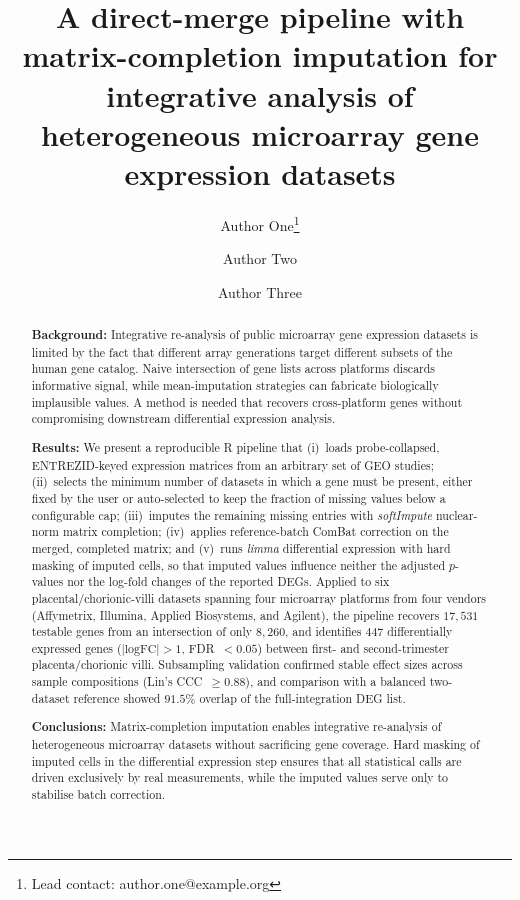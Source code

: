 \documentclass[11pt,a4paper]{article}
\title{A direct-merge pipeline with matrix-completion imputation
  for integrative analysis of heterogeneous microarray gene
  expression datasets}
\author[1]{Author One\thanks{Lead contact: author.one@example.org}}
\author[1]{Author Two}
\author[1]{Author Three}
\affil[1]{Institute of Molecular Biology and Genetics,
  National Academy of Sciences of Ukraine, Kyiv, Ukraine}
\date{}
\begin{document}
\maketitle

\begin{abstract}
\noindent\textbf{Background:}
Integrative re-analysis of public microarray gene expression
datasets is limited by the fact that different array generations
target different subsets of the human gene catalog. Naive
intersection of gene lists across platforms discards informative
signal, while mean-imputation strategies can fabricate
biologically implausible values. A method is needed that recovers
cross-platform genes without compromising downstream differential
expression analysis.

\noindent\textbf{Results:}
We present a reproducible R pipeline that
(i)~loads probe-collapsed, ENTREZID-keyed expression matrices
from an arbitrary set of GEO studies;
(ii)~selects the minimum number of datasets in which a gene must
be present, either fixed by the user or auto-selected to keep the
fraction of missing values below a configurable cap;
(iii)~imputes the remaining missing entries with
\textit{softImpute} nuclear-norm matrix completion;
(iv)~applies reference-batch ComBat correction on the merged,
completed matrix; and
(v)~runs \textit{limma} differential expression with hard masking
of imputed cells, so that imputed values influence neither the
adjusted $p$-values nor the log-fold changes of the reported DEGs.
Applied to six placental/chorionic-villi datasets spanning four
microarray platforms from four vendors (Affymetrix, Illumina,
Applied Biosystems, and Agilent), the pipeline recovers $17{,}531$
testable genes from an intersection of only $8{,}260$, and
identifies $447$ differentially expressed genes
($|\text{logFC}| > 1$, FDR~$< 0.05$) between first- and
second-trimester placenta/chorionic villi.
Subsampling validation confirmed stable effect sizes across
sample compositions (Lin's CCC~$\ge 0.88$), and comparison with a
balanced two-dataset reference showed $91.5\%$ overlap of the
full-integration DEG list.

\noindent\textbf{Conclusions:}
Matrix-completion imputation enables integrative re-analysis of
heterogeneous microarray datasets without sacrificing gene
coverage. Hard masking of imputed cells in the differential
expression step ensures that all statistical calls are driven
exclusively by real measurements, while the imputed values serve
only to stabilise batch correction.
\end{abstract}
\end{document}
